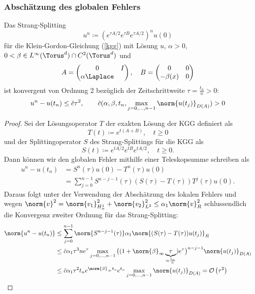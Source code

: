 \subsubsection*{Abschätzung des globalen Fehlers}
\begin{maththeorem}
Das Strang-Splitting 
\[u^n\coloneqq \left(e^{\tau A/2}e^{\tau B}e^{\tau A/2}\right)^nu(0)\]
für die Klein-Gordon-Gleichung (\ref{kgg}) mit Lösung $u$, $\alpha>0$, $0<\beta\in L^\infty(\Torus^d)\cap C^2(\Torus^d)$ und
\[A=\begin{pmatrix}0 & I\\ \alpha\Laplace\end{pmatrix}, \quad B=\begin{pmatrix}0 & 0\\ -\beta(x) & 0\end{pmatrix}\]
ist konvergent von Ordnung 2 bezüglich der Zeitschrittweite $\tau=\frac{t_n}{n}>0$:
\[u^n-u(t_n)\le \hat{c}\tau^2, \qquad \hat{c}(\alpha,\beta,t_n,\max_{j=0,\dots,n-1}\norm{u(t_j)}_{D(A)})>0\]
\end{maththeorem}
\begin{proof}
Sei der Lösungsoperator $T$ der exakten Lösung der KGG definiert als
\[T(t)\coloneqq e^{t(A+B)},\quad t\ge 0\]
und der Splittingoperator $S$ des Strang-Splittings für die KGG als
\[S(t)\coloneqq e^{tA/2}e^{tB}e^{tA/2},\quad t\ge 0.\]
Dann können wir den globalen Fehler mithilfe einer Teleskopsumme schreiben als
\begin{align*}
u^n-u(t_n)&=S^n(\tau)u(0)-T^n(\tau)u(0)\\
&=\sum_{j=0}^{n-1}S^{n-j-1}(\tau)\left(S(\tau)-T(\tau)\right)T^j(\tau)u(0).
\end{align*}
Daraus folgt unter der Verwendung der Abschätzung des lokalen Fehlers und wegen $\norm{v}^2=\norm{v_1}_{H_\alpha^1}^2+\norm{v_2}_{L^2}^2\le \alpha_1 \norm{v}_R^2$ schlussendlich die Konvergenz zweiter Ordnung für das Strang-Splitting:
\begin{align*}
\norm{u^n-u(t_n)}&\le \sum_{j=0}^{n-1}\norm{S^{n-j-1}(\tau)}\alpha_1\norm{(S(\tau)-T(\tau))u(t_j)}_R\\
&\le \tilde{c}\alpha_1\tau^3ne^\tau\max_{j=0,\dots,n-1}\big((1+\norm{\beta}_\infty\underbrace{\tau}_{=\frac{t_n}{n}})e^\tau\big)^{n-j-1}\norm{u(t_j)}_{D(A)}\\
&\le \tilde{c}\alpha_1\tau^2t_ne^{\norm{\beta}_\infty t_n}e^{t_n}\max_{j=0,\dots,n-1}\norm{u(t_j)}_{D(A)}
=\mathcal{O}\left(\tau^2\right)
\end{align*}
\end{proof}
